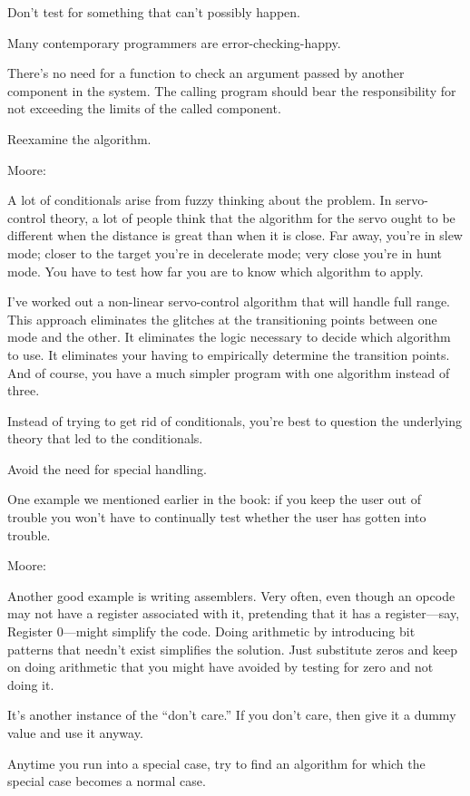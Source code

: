 \begin{tip}
Don't test for something that can't possibly happen.
\end{tip}
Many contemporary programmers are error-checking-happy.

There's no need for a function to check an argument passed by
another component in the system. The calling program should bear the
responsibility for not exceeding the limits of the called component.

\begin{tip}
Reexamine the algorithm.
\end{tip}
\bigskip\blackline{2ex}
\noindent Moore:
\begin{tfquot}
A lot of conditionals arise from fuzzy thinking about the problem. In
servo-control theory, a lot of people think that the algorithm for the servo
ought to be different when the distance is great than when it is close. Far
away, you're in slew mode; closer to the target you're in decelerate mode;
very close you're in hunt mode. You have to test how far you are to know
which algorithm to apply.

I've worked out a non-linear servo-control algorithm that will handle full
range. This approach eliminates the glitches at the transitioning points
between one mode and the other. It eliminates the logic necessary to decide
which algorithm to use. It eliminates your having to empirically determine
the transition points. And of course, you have a much simpler program with
one algorithm instead of three.

Instead of trying to get rid of conditionals, you're best to question the
underlying theory that led to the conditionals.
\end{tfquot}\blackline{1ex}
\begin{tip}
Avoid the need for special handling.
\end{tip}
One example we mentioned earlier in the book: if you keep the user out of
trouble you won't have to continually test whether the user has gotten
into trouble.

\bigskip\blackline{2ex}
\noindent Moore:
\begin{tfquot}
Another good example is writing assemblers. Very often, even though an
opcode may not have a register associated with it, pretending that it has a
register---say, Register 0---might simplify the code. Doing arithmetic by
introducing bit patterns that needn't exist simplifies the solution. Just
substitute zeros and keep on doing arithmetic that you might have avoided
by testing for zero and not doing it.

It's another instance of the ``don't care.'' If you don't care, then give
it a dummy value and use it anyway.
\end{tfquot}\blackline{1ex}
Anytime you run into a special case, try to find an algorithm for which
the special case becomes a normal case.

